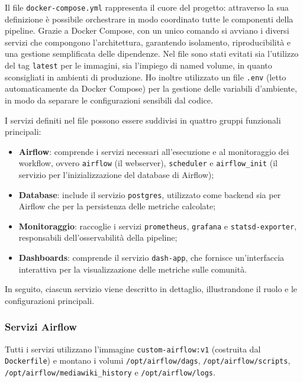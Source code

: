 Il file \texttt{docker-compose.yml} rappresenta il cuore del progetto: attraverso la sua definizione è possibile orchestrare in modo coordinato tutte le componenti della pipeline.  
Grazie a Docker Compose, con un unico comando si avviano i diversi servizi che compongono l’architettura, garantendo isolamento, riproducibilità e una gestione semplificata delle dipendenze.
Nel file sono stati evitati sia l’utilizzo del tag \texttt{latest} per le immagini, sia l’impiego di named volume, in quanto sconsigliati in ambienti di produzione.%
Ho inoltre utilizzato un file \texttt{.env} (letto automaticamente da Docker Compose) per la gestione delle variabili d’ambiente, in modo da separare le configurazioni sensibili dal codice.

I servizi definiti nel file possono essere suddivisi in quattro gruppi funzionali principali:  

\begin{itemize}
    \item \textbf{Airflow}: comprende i servizi necessari all’esecuzione e al monitoraggio dei workflow, ovvero \texttt{airflow} (il webserver), \texttt{scheduler} e \texttt{airflow\_init} (il servizio per l’inizializzazione del database di Airflow);
    \item \textbf{Database}: include il servizio \texttt{postgres}, utilizzato come backend sia per Airflow che per la persistenza delle metriche calcolate;
    \item \textbf{Monitoraggio}: raccoglie i servizi \texttt{prometheus}, \texttt{grafana} e \texttt{statsd-exporter}, responsabili dell’osservabilità della pipeline;
    \item \textbf{Dashboards}: comprende il servizio \texttt{dash-app}, che fornisce un’interfaccia interattiva per la visualizzazione delle metriche sulle comunità.
\end{itemize}


In seguito, ciascun servizio viene descritto in dettaglio, illustrandone il ruolo e le configurazioni principali.
\subsubsection{Servizi Airflow}

Tutti i servizi utilizzano l’immagine \texttt{custom-airflow:v1} (costruita dal \texttt{Dockerfile}) e montano i volumi \texttt{/opt/airflow/dags}, \texttt{/opt/airflow/scripts}, \texttt{/opt/airflow/mediawiki\_history} e \texttt{/opt/airflow/\allowbreak logs}.

